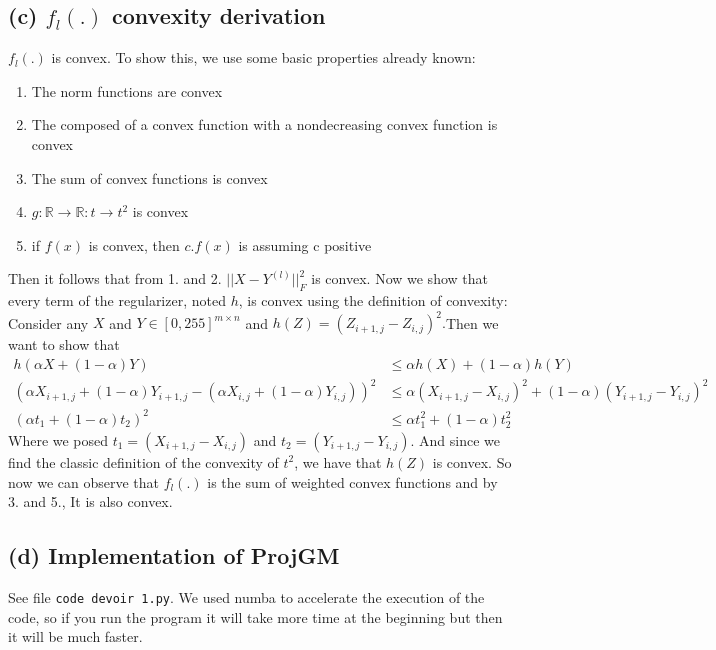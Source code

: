 \documentclass{article}
\begin{document}
\subsection*{(c) $f_{l}(.)$ convexity derivation}
$f_l(.)$ is convex. To show this, we use some basic properties already known:
\begin{enumerate}
\item The norm functions are convex
\item The composed of a convex function with a nondecreasing convex function is
convex
\item The sum of convex functions is convex
\item $g : \mathbb{R} \to \mathbb{R} : t \to t^2$ is convex
\item if $f(x)$ is convex, then $c.f(x)$ is assuming c positive
\end{enumerate}
Then it follows that from 1. and 2. $||X-Y^{(l)}||_{F}^2$ is convex.
Now we show that every term of the regularizer, noted $h$, is convex using the 
definition of convexity: \\
Consider any $X$ and $Y \in [0,255]^{m\times n}$ and $h(Z) = (Z_{i+1,j}-Z_{i,j})^2.
$Then we want to show that
\begin{align*}
h(\alpha X + (1-\alpha)Y) &\leq \alpha h(X) + (1-\alpha)h(Y) \\
(\alpha X_{i+1,j} + (1-\alpha) Y_{i+1,j} - (\alpha X_{i,j} + (1-\alpha)Y_{i,j}))^2
&\leq \alpha (X_{i+1,j}-X_{i,j})^2 + (1-\alpha)(Y_{i+1,j} - Y_{i,j})^2 \\
(\alpha t_1 + (1-\alpha)t_2)^2 &\leq \alpha t_1^2 + (1-\alpha) t_2^2 
\end{align*}
Where we posed $t_1 = (X_{i+1,j} - X_{i,j})$ and $t_2 = (Y_{i+1,j} - Y_{i,j})$. And
since we find the classic definition of the convexity of $t^2$, we have 
that $h(Z)$ is convex. So now we can observe that $f_l(.)$ is the sum of 
weighted convex functions and by 3. and 5., It is also convex.







\subsection*{(d) Implementation of ProjGM}
See file \texttt{code devoir 1.py}. We used numba to accelerate the execution of the code, so 
if you run the program it will take more time at the beginning but then it will be much faster.
\end{document}
